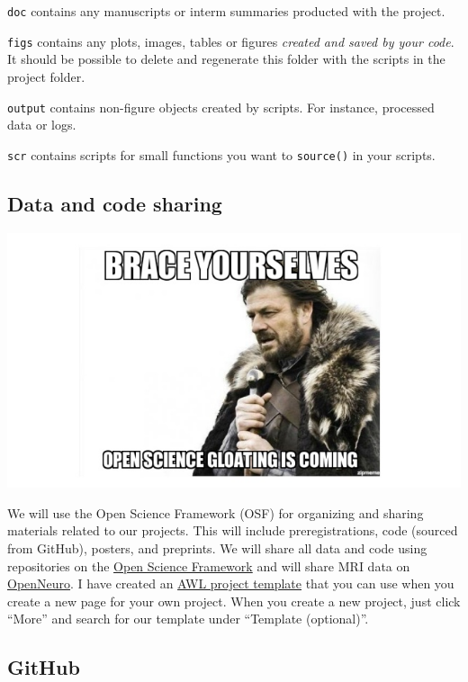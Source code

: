 \documentclass[]{book}
\begin{document}
\texttt{doc} contains any manuscripts or interm summaries producted with the project.

\texttt{figs} contains any plots, images, tables or figures \emph{created and saved by your code}. It should be possible to delete and regenerate this folder with the scripts in the project folder.

\texttt{output} contains non-figure objects created by scripts. For instance, processed data or logs.

\texttt{scr} contains scripts for small functions you want to \texttt{source()} in your scripts.

\hypertarget{data-and-code-sharing}{%
\subsection{Data and code sharing}\label{data-and-code-sharing}}

\includegraphics{images/open_science.jpg}

We will use the Open Science Framework (OSF) for organizing and sharing materials related to our projects. This will include preregistrations, code (sourced from GitHub), posters, and preprints. We will share all data and code using repositories on the \href{https://osf.io/}{Open Science Framework} and will share MRI data on \href{https://openneuro.org/}{OpenNeuro}. I have created an \href{https://osf.io/ce8p4/}{AWL project template} that you can use when you create a new page for your own project. When you create a new project, just click ``More'' and search for our template under ``Template (optional)''.

\hypertarget{github}{%
\subsection{GitHub}\label{github}}
\end{document}
